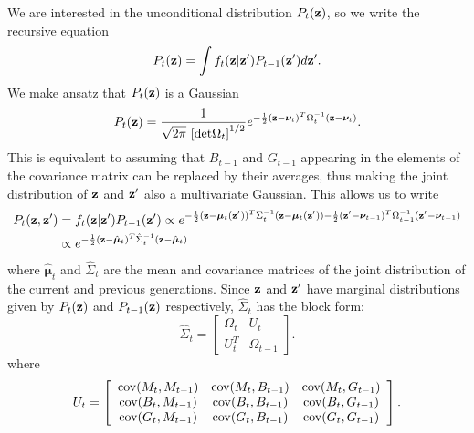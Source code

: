 \documentclass{article}
\newcommand{\bz}{{\bf z}}
\newcommand{\bmu}{{\boldsymbol \mu}}
\newcommand{\bnu}{{\boldsymbol \nu}}
\begin{document}
We are interested in the unconditional distribution $P_t(\bz)$, so we write the recursive equation
\begin{equation}
P_t(\bz) = \int f_t(\bz|\bz')P_{t-1}(\bz') d\bz'.
\end{equation}
We make ansatz that $P_t(\bz)$ is a Gaussian 
\begin{equation}
P_t(\bz) = \frac{1}{\sqrt{2\pi }\, \left[{\rm det}\Omega_{t}\right]^{1/2}} e^{-\frac{1}{2}(\bz-\bnu_{t})^T\Omega_{t}^{-1}(\bz-\bnu_{t})}.
\end{equation}
This is equivalent to assuming that $B_{t-1}$ and $G_{t-1}$ appearing in the elements of the covariance matrix can be replaced by their averages, thus making the joint distribution of $\bz$ and $\bz'$ also a multivariate Gaussian. This allows us to write 
\begin{align}
\begin{split}
P_t(\bz,\bz') &= f_t(\bz|\bz')P_{t-1}(\bz') \propto e^{-\frac{1}{2}(\bz-\bmu_{t}(\bz'))^T\Sigma_{t}^{-1}(\bz-\bmu_{t}(\bz'))-\frac{1}{2}(\bz'-\bnu_{t-1})^T\Omega_{t-1}^{-1}(\bz'-\bnu_{t-1})}\\
&\propto e^{-\frac{1}{2}(\bz-\hat{\bmu}_t)^T\hat{\Sigma}_{t}^{-1}(\bz-\hat{\bmu}_{t})}
\end{split}
\end{align} 
where $\hat{\bmu}_t$ and $\hat{\Sigma}_{t}$ are the mean and covariance matrices of the joint distribution of the current and previous generations. 
Since $\bz$ and $\bz'$ have marginal distributions given by  $P_{t}(\bz)$ and $P_{t-1}(\bz)$ respectively, $\hat{\Sigma}_{t}$ has the block form:
\begin{equation}
\hat{\Sigma}_{t} = \left[ \begin{array}{cc}
\Omega_t  & U_t\\
U_t^T  &\Omega_{t-1} 
\end{array}\right].
\end{equation}
where 
\begin{equation}
U_t =\left[ \begin{array}{ccc}
{\rm cov}(M_t,M_{t-1})  &{\rm cov}(M_t,B_{t-1})  &{\rm cov}(M_t,G_{t-1}) \\
{\rm cov}(B_t,M_{t-1})  &{\rm cov}(B_t,B_{t-1})  &{\rm cov}(B_t,G_{t-1}) \\
{\rm cov}(G_t,M_{t-1})  &{\rm cov}(G_t,B_{t-1})  &{\rm cov}(G_t,G_{t-1}) 
\end{array}\right].
\end{equation}
\end{document}
